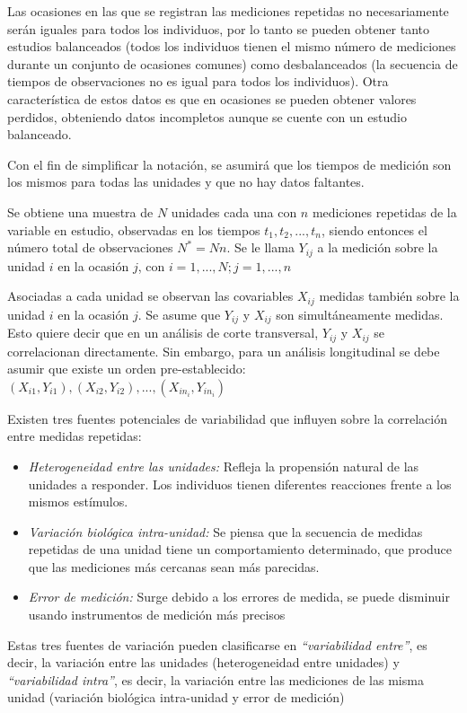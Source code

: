 \documentclass[spanish]{article}
\numberwithin{figure}{subsection}
\numberwithin{equation}{subsection}
\numberwithin{table}{subsection}
\begin{document}
Las ocasiones en las que se registran las mediciones repetidas no
necesariamente serán iguales para todos los individuos, por lo tanto se pueden
obtener tanto estudios balanceados (todos los individuos tienen el mismo número
de mediciones durante un conjunto de ocasiones comunes) como desbalanceados (la
secuencia de tiempos de observaciones no es igual para todos los individuos).
Otra característica de estos datos es que en ocasiones se pueden obtener
valores perdidos, obteniendo datos incompletos aunque se cuente con un estudio
balanceado.

Con el fin de simplificar la notación, se asumirá que los tiempos de medición
son los mismos para todas las unidades y que no hay datos faltantes.

Se obtiene una muestra de $N$ unidades cada una con $n$ mediciones repetidas de
la variable en estudio, observadas en los tiempos $t_1, t_2, ..., t_n$, siendo
entonces el número total de observaciones $N^*=Nn$. Se le llama $Y_{ij}$ a la
medición sobre la unidad $i$ en la ocasión $j$, con $i=1, ..., N; j=1, ..., n$

Asociadas a cada unidad se observan las covariables $X_{ij}$ medidas también
sobre la unidad $i$ en la ocasión $j$. Se asume que $Y_{ij}$ y $X_{ij}$ son
simultáneamente medidas. Esto quiere decir que en un análisis de corte
transversal, $Y_{ij}$ y $X_{ij}$ se correlacionan directamente. Sin embargo,
para un análisis longitudinal se debe asumir que existe un orden
pre-establecido:
$(X_{i1}, Y_{i1}), (X_{i2}, Y_{i2}), ..., (X_{in_i}, Y_{in_i})$


Existen tres fuentes potenciales de variabilidad que influyen sobre la
correlación entre medidas repetidas:

\begin{itemize}
	\item \textit{Heterogeneidad entre las unidades:} Refleja la propensión
	natural de las unidades a responder. Los individuos tienen diferentes
	reacciones frente a los mismos estímulos.
	\item \textit{Variación biológica intra-unidad:} Se piensa que la secuencia
	de medidas repetidas de una unidad tiene un comportamiento determinado, que
	produce que las mediciones más cercanas sean más parecidas.
	\item \textit{Error de medición:} Surge debido a los errores de medida, se
	puede disminuir usando instrumentos de medición más precisos
\end{itemize}

Estas tres fuentes de variación pueden clasificarse en \textit{``variabilidad
entre''}, es decir, la variación entre las unidades (heterogeneidad entre
unidades) y \textit{``variabilidad intra''}, es decir, la variación entre las
mediciones de las misma unidad (variación biológica intra-unidad y error de
medición)
\end{document}
